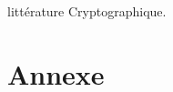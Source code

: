 \documentclass[a4paper]{report}
\begin{document}
littérature Cryptographique.
		
		\chapter{Annexe}


		
\end{document}
